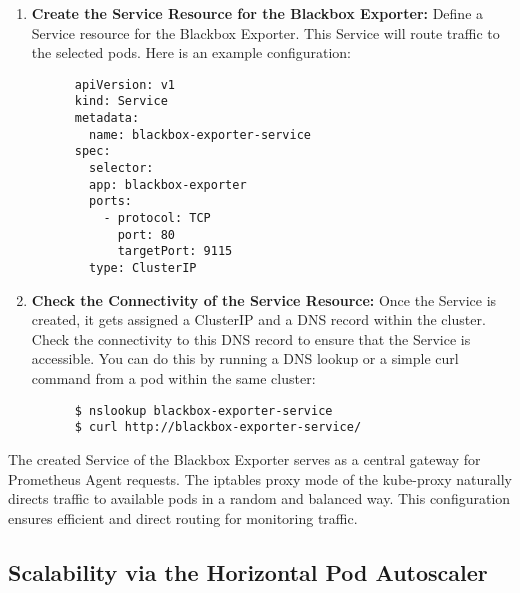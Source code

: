 \begin{enumerate}
  \item \textbf{Create the Service Resource for the Blackbox Exporter:}
  Define a Service resource for the Blackbox Exporter. This Service will route traffic to the selected pods. Here is an example configuration:

  \begin{minipage}{\linewidth}
    \begin{lstlisting}
      apiVersion: v1
      kind: Service
      metadata:
        name: blackbox-exporter-service
      spec:
        selector:
        app: blackbox-exporter
        ports:
          - protocol: TCP
            port: 80
            targetPort: 9115
        type: ClusterIP
      \end{lstlisting}
  \end{minipage}

  \item \textbf{Check the Connectivity of the Service Resource:}
  Once the Service is created, it gets assigned a ClusterIP and a DNS record within the cluster. Check the connectivity to this DNS record to ensure that the Service is accessible. You can do this by running a DNS lookup or a simple curl command from a pod within the same cluster: 
    \begin{lstlisting}
      $ nslookup blackbox-exporter-service
      $ curl http://blackbox-exporter-service/
    \end{lstlisting}
\end{enumerate}

The created Service of the Blackbox Exporter serves as a central gateway for Prometheus Agent requests. The iptables proxy mode of the kube-proxy naturally directs traffic to available pods in a random and balanced way. This configuration ensures efficient and direct routing for monitoring traffic. 

\subsection{Scalability via the Horizontal Pod Autoscaler}

